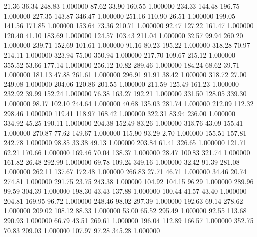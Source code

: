      21.36     36.34    248.83  1.000000
     87.62     33.90    160.55  1.000000
    234.33    144.48    196.75  1.000000
    227.35    143.87    346.47  1.000000
    251.16    110.90     26.51  1.000000
    199.05    141.56    171.85  1.000000
    153.64     73.36    210.71  1.000000
     92.47    127.22    161.47  1.000000
    120.40     41.10    183.69  1.000000
    124.57    103.43    211.04  1.000000
     32.57     99.94    260.20  1.000000
    239.71    152.69    101.61  1.000000
     91.16     80.23    195.22  1.000000
    318.28     70.97    214.11  1.000000
    323.94     75.00    350.94  1.000000
    217.70    109.67    215.12  1.000000
    355.52     53.66    177.14  1.000000
    256.12     10.82    289.46  1.000000
    184.24     68.62     39.71  1.000000
    181.13     47.88    261.61  1.000000
    296.91     91.91     38.42  1.000000
    318.72     27.00    249.08  1.000000
    204.06    120.86    201.55  1.000000
    211.59    125.49    161.23  1.000000
    232.92     39.99    152.24  1.000000
     76.38    163.27    192.21  1.000000
    331.50    128.05    339.30  1.000000
     98.17    102.10    244.64  1.000000
     40.68    135.03    281.74  1.000000
    212.09    112.32    298.46  1.000000
    119.41    118.97    168.42  1.000000
    322.31     83.94    236.00  1.000000
    334.92     45.25    190.11  1.000000
    204.38    152.49     83.26  1.000000
    318.76     43.09    155.41  1.000000
    270.87     77.62    149.67  1.000000
    115.90     93.29      2.70  1.000000
    155.51    157.81    242.78  1.000000
     98.85     33.38     49.13  1.000000
    203.84     61.41    326.65  1.000000
    121.71     62.21    170.66  1.000000
    169.46     70.04    138.37  1.000000
     28.47    100.83    321.74  1.000000
    161.82     26.48    292.99  1.000000
     69.78    109.24    349.16  1.000000
     32.42     91.39    281.08  1.000000
    262.11    137.67    172.48  1.000000
    266.83     27.71     46.71  1.000000
     34.46     20.74    274.81  1.000000
    291.75     23.75    243.38  1.000000
    104.92    104.15     96.29  1.000000
    289.96     99.59    304.39  1.000000
    198.30     43.43    137.88  1.000000
    100.44     41.57     43.40  1.000000
    204.81    169.95     96.72  1.000000
    248.46     98.02    297.39  1.000000
    192.63     69.14    278.62  1.000000
    209.02    108.12     88.33  1.000000
     53.00     65.52    295.49  1.000000
     92.55    113.68    290.93  1.000000
     66.79     43.51    269.61  1.000000
    196.04    112.89    166.57  1.000000
    352.75     70.83    209.03  1.000000
    107.97     97.28    345.28  1.000000
